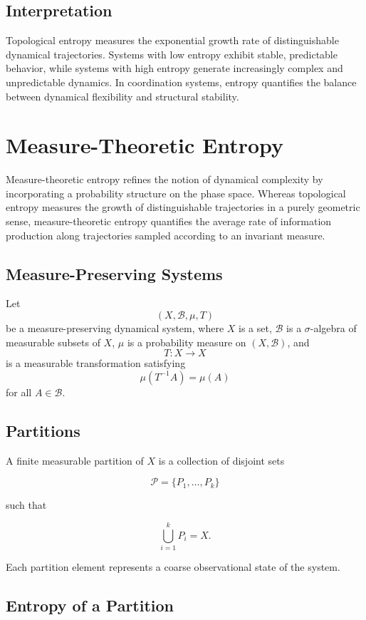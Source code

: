 \documentclass[12pt]{article}
\begin{document}
\subsection{Interpretation}

Topological entropy measures the exponential growth rate of distinguishable dynamical trajectories. Systems with low entropy exhibit stable, predictable behavior, while systems with high entropy generate increasingly complex and unpredictable dynamics. In coordination systems, entropy quantifies the balance between dynamical flexibility and structural stability.

\section{Measure-Theoretic Entropy}

Measure-theoretic entropy refines the notion of dynamical complexity by incorporating a probability structure on the phase space. Whereas topological entropy measures the growth of distinguishable trajectories in a purely geometric sense, measure-theoretic entropy quantifies the average rate of information production along trajectories sampled according to an invariant measure.

\subsection{Measure-Preserving Systems}

Let
\[
(X,\mathcal{B},\mu,T)
\]
be a measure-preserving dynamical system, where $X$ is a set, $\mathcal{B}$ is a $\sigma$-algebra of measurable subsets of $X$, $\mu$ is a probability measure on $(X,\mathcal{B})$, and
\[
T : X \rightarrow X
\]
is a measurable transformation satisfying
\[
\mu(T^{-1}A) = \mu(A)
\]
for all $A \in \mathcal{B}$.

\subsection{Partitions}

A finite measurable partition of $X$ is a collection of disjoint sets

\[
\mathcal{P} = \{P_1,\dots,P_k\}
\]

such that

\[
\bigcup_{i=1}^k P_i = X.
\]

Each partition element represents a coarse observational state of the system.

\subsection{Entropy of a Partition}
\end{document}
